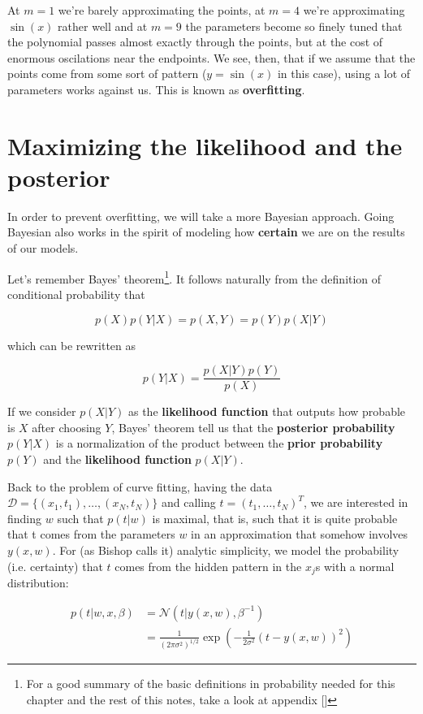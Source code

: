 At $m=1$ we're barely approximating the points, at $m=4$ we're approximating $\sin(x)$ rather well and at $m=9$ the parameters become so finely tuned that the polynomial passes almost exactly through the points, but at the cost of enormous oscilations near the endpoints. We see, then, that if we assume that the points come from some sort of pattern ($y = \sin(x)$ in this case), using a lot of parameters works against us. This is known as \textbf{overfitting}.

\section{Maximizing the likelihood and the posterior}

In order to prevent overfitting, we will take a more Bayesian approach. Going Bayesian also works in the spirit of modeling how \textbf{certain} we are on the results of our models.

Let's remember Bayes' theorem\footnote{For a good summary of the basic definitions in probability needed for this chapter and the rest of this notes, take a look at appendix []}. It follows naturally from the definition of conditional probability that

\[p(X)p(Y|X) = p(X,Y) = p(Y)p(X|Y)\]

which can be rewritten as

\[p(Y|X) = \frac{p(X|Y)p(Y)}{p(X)}\]

If we consider $p(X|Y)$ as the \textbf{likelihood function} that outputs how probable is $X$ after choosing $Y$, Bayes' theorem tell us that the \textbf{posterior probability} $p(Y|X)$ is a normalization of the product between the \textbf{prior probability} $p(Y)$ and the \textbf{likelihood function} $p(X|Y)$.

Back to the problem of curve fitting, having the data $\mathcal{D} = \{(x_1, t_1),\dots,(x_N, t_N)\}$ and calling $t = (t_1,\dots, t_N)^T$, we are interested in finding $w$ such that $p(t|w)$ is maximal, that is, such that it is quite probable that t comes from the parameters $w$ in an approximation that somehow involves $y(x,w)$. For (as Bishop calls it) analytic simplicity, we model the probability (i.e. certainty) that $t$ comes from the hidden pattern in the $x_j$s with a normal distribution:

\begin{align*}
	p(t|w, x, \beta) &= \mathcal{N}(t|y(x,w), \beta^{-1})\\
	&= \frac{1}{(2\pi\sigma^2)^{1/2}}\exp\left(-\frac{1}{2\sigma^2}(t-y(x,w))^2\right)
\end{align*}

